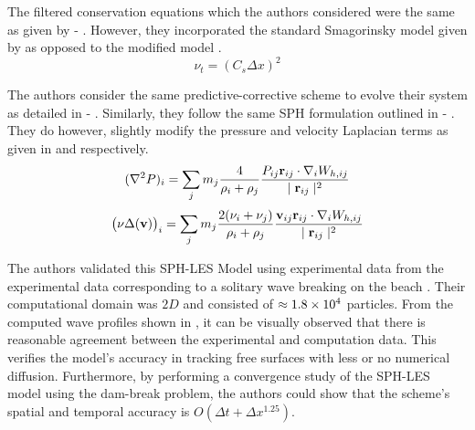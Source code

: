 The filtered conservation equations which the authors considered were the same as given by  - . However, they incorporated the standard Smagorinsky model \parencite{smagorinsky1963general} given by  as opposed to the modified model .
\begin{equation}
    \nu_t = (C_s \Delta x)^2
    \label{eq:Shao2005-eddy-visc}
\end{equation}

The authors consider the same predictive-corrective scheme to evolve their system as detailed in  - .
Similarly, they follow the same SPH formulation outlined in  - . They do however, slightly modify the pressure and velocity Laplacian terms as given in  and  respectively.
\begin{equation}
    (\nabla^2 P)_i = \sum_j m_j \frac{4}{\rho_i + \rho_j} \frac{P_{ij} \mathbf{r}_{ij} \cdot \nabla_{i} W_{h, ij} }{\mid \mathbf{r}_{ij} \mid^{2}}
    \label{eq:Shao2005-P-laplacian-sph}
\end{equation}
\begin{equation}
    \big(\nu \Delta(\mathbf{v}) \big)_i = \sum_j m_j \frac{2(\nu_i + \nu_j)}{\rho_i + \rho_j}\frac{\mathbf{v}_{ij} \mathbf{r}_{ij} \cdot \nabla_{i} W_{h, ij}}{\mid \mathbf{r}_{ij} \mid^{2}}
    \label{eq:Shao2005-vel-laplacian-sph}
\end{equation}

The authors validated this SPH-LES Model using experimental data from the experimental data corresponding to a solitary wave breaking on the beach \parencite{Synolakis1986}. Their computational domain was $2D$ and consisted of $\approx 1.8 \times {10}^{4}$ particles. 
From the computed wave profiles shown in , it can be visually observed that there is reasonable agreement between the experimental and computation data. This verifies the model’s accuracy in tracking free surfaces with less or no numerical diffusion.
Furthermore, by performing a convergence study of the SPH-LES model using the dam-break problem, the authors could show that the scheme’s spatial and temporal accuracy is $O(\Delta t + \Delta x^{1.25})$.

